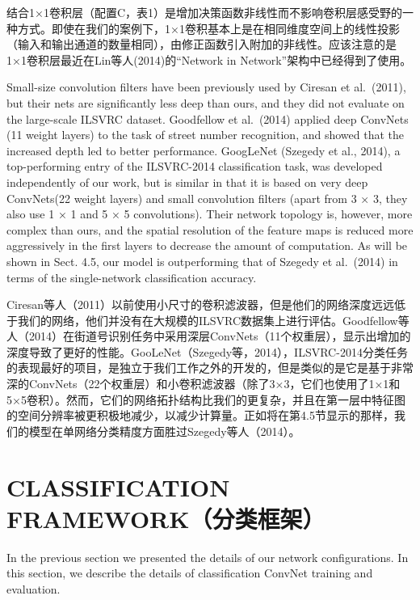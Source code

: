 \documentclass[12pt,a4paper,UTF8,twoside]{book}
\begin{document}
结合1×1卷积层（配置C，表1）是增加决策函数非线性而不影响卷积层感受野的一种方式。即使在我们的案例下，1×1卷积基本上是在相同维度空间上的线性投影（输入和输出通道的数量相同），由修正函数引入附加的非线性。应该注意的是1×1卷积层最近在Lin等人(2014)的``Network in Network''架构中已经得到了使用。

Small-size convolution filters have been previously used by Ciresan et al.~(2011), but their nets are significantly less deep than ours, and they did not evaluate on the large-scale ILSVRC dataset. Goodfellow et al.~(2014) applied deep ConvNets (11 weight layers) to the task of street number recognition, and showed that the increased depth led to better performance. GoogLeNet (Szegedy et al., 2014), a top-performing entry of the ILSVRC-2014 classification task, was developed independently of our work, but is similar in that it is based on very deep ConvNets(22 weight layers) and small convolution filters (apart from 3 × 3, they also use 1 × 1 and 5 × 5 convolutions). Their network topology is, however, more complex than ours, and the spatial resolution of the feature maps is reduced more aggressively in the first layers to decrease the amount of computation. As will be shown in Sect. 4.5, our model is outperforming that of Szegedy et al.~(2014) in terms of the single-network classification accuracy.

Ciresan等人（2011）以前使用小尺寸的卷积滤波器，但是他们的网络深度远远低于我们的网络，他们并没有在大规模的ILSVRC数据集上进行评估。Goodfellow等人（2014）在街道号识别任务中采用深层ConvNets（11个权重层），显示出增加的深度导致了更好的性能。GooLeNet（Szegedy等，2014），ILSVRC-2014分类任务的表现最好的项目，是独立于我们工作之外的开发的，但是类似的是它是基于非常深的ConvNets（22个权重层）和小卷积滤波器（除了3×3，它们也使用了1×1和5×5卷积）。然而，它们的网络拓扑结构比我们的更复杂，并且在第一层中特征图的空间分辨率被更积极地减少，以减少计算量。正如将在第4.5节显示的那样，我们的模型在单网络分类精度方面胜过Szegedy等人（2014）。

\hypertarget{classification-frameworkux5206ux7c7bux6846ux67b6}{%
\section{CLASSIFICATION FRAMEWORK（分类框架）}\label{classification-frameworkux5206ux7c7bux6846ux67b6}}

In the previous section we presented the details of our network configurations. In this section, we describe the details of classification ConvNet training and evaluation.
\end{document}
